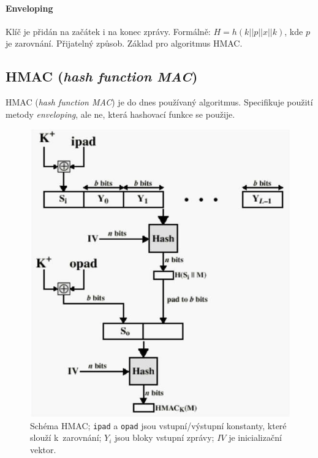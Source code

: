 \paragraph*{Enveloping} Klíč je přidán na začátek i na konec zprávy. Formálně: $H = h(k || p || x || k)$, kde $p$ je zarovnání. Přijatelný způsob. Základ pro algoritmus HMAC.

\subsection{HMAC (\textit{hash function MAC})}

HMAC (\textit{hash function MAC}) je do dnes používaný algoritmus. Specifikuje použití metody \textit{enveloping}, ale ne, která hashovací funkce se použije.

\begin{figure}[H]
    \centering
    \includegraphics[width=0.9\linewidth]{hmac.png}
    \caption{Schéma HMAC; \texttt{ipad} a \texttt{opad} jsou vstupní/výstupní konstanty, které slouží k~zarovnání; $Y_i$ jsou bloky vstupní zprávy; $IV$ je inicializační vektor.}
\end{figure}
